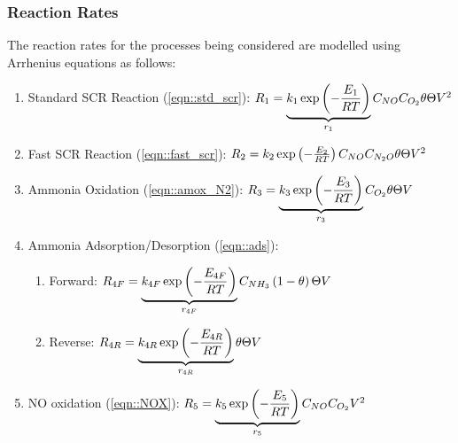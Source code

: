 \subsubsection{Reaction Rates}
The reaction rates for the processes being considered are modelled using
Arrhenius equations as follows:
\begin{enumerate}
\item Standard SCR Reaction (\ref{eqn::std_scr}):
$ R_1 = \underbrace{k_1 \exp\left( -\frac{E_1}{RT} \right)}_{r_1} C_{NO} C_{O_2} \theta \Theta V^2 $

\item Fast SCR Reaction (\ref{eqn::fast_scr}):
$ R_2 = k_2 \exp\left( -\frac{E_2}{RT} \right) C_{NO} C_{N_2O} \theta \Theta V^2 $

\item Ammonia Oxidation (\ref{eqn::amox_N2}):
$ R_3 = \underbrace{k_3 \exp\left( -\frac{E_3}{RT} \right)}_{r_3} C_{O_2} \theta \Theta
V $

\item Ammonia Adsorption/Desorption (\ref{eqn::ads}):
\begin{enumerate}
    \item Forward: $ R_{4F} = \underbrace{k_{4F} \exp \left( -\frac{E_{4F}}{RT} \right)}_{r_{4F}} C_{NH_3} \left( 1-\theta \right) \Theta V$

    \item Reverse: $ R_{4R} = \underbrace{k_{4R} \exp \left( -\frac{E_{4R}}{RT} \right)}_{r_{4R}} \theta
\Theta V $
\end{enumerate}

\item NO oxidation (\ref{eqn::NOX}):
$ R_5 = \underbrace{k_5 \exp \left( - \frac{E_5}{RT} \right)}_{r_5} C_{NO} C_{O_2} V^2 $
\end{enumerate}

